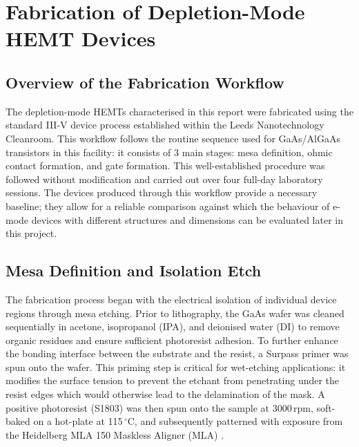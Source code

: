 \chapter{Fabrication of Depletion-Mode HEMT Devices}

\section{Overview of the Fabrication Workflow}

The depletion-mode HEMTs characterised in this report were fabricated using 
the standard III-V device process established within the Leeds Nanotechnology 
Cleanroom. This workflow follows the routine sequence used for 
GaAs/AlGaAs transistors in this facility: it consists of 3 main stages: mesa definition, 
ohmic contact formation, and gate formation. 
This well-established procedure was followed without modification and carried 
out over four full-day laboratory sessions. The devices produced 
through this workflow provide a necessary baseline; they allow for a reliable 
comparison against which the behaviour of e-mode devices with different structures 
and dimensions can be evaluated later in this project.

\vspace{1mm}



\section{Mesa Definition and Isolation Etch}

The fabrication process began with the electrical isolation of individual 
device regions through mesa etching. Prior to lithography, the 
GaAs wafer was cleaned sequentially in acetone, isopropanol (IPA), and 
deionised water (DI) to remove organic residues and ensure sufficient 
photoresist adhesion. To further enhance the bonding interface 
between the substrate and the resist, a Surpass primer was spun onto the 
wafer. This priming step is critical for wet-etching applications: it 
modifies the surface tension to prevent the etchant from penetrating under 
the resist edges which would otherwise 
lead to the delamination of the mask. A positive photoresist (S1803) was 
then spun onto the sample at 3000\,rpm, soft-baked on a hot-plate at 115\,$^{\circ}$C, 
and subsequently patterned with exposure from the Heidelberg MLA 150 
Maskless Aligner (MLA) \cite{leedscleanroom_equipment}.

